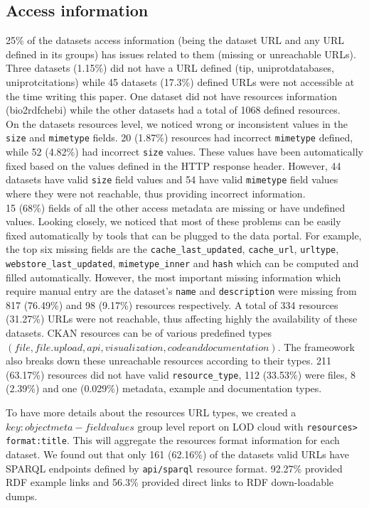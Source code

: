 \documentclass[runningheads,a4paper]{llncs}
\begin{document}
\subsection{Access information} 25\% of the datasets access information (being the dataset URL and any URL defined in its groups) has issues related to them (missing or unreachable URLs).
Three datasets (1.15\%) did not have a URL defined (tip, uniprot\-databases, uniprot\-citations) while 45 datasets (17.3\%) defined URLs were not accessible at the time writing this paper. One dataset did not have resources information (bio2rdf\-chebi) while the other datasets had a total of 1068 defined resources.\\
On the datasets resources level, we noticed wrong or inconsistent values in the \texttt{size} and \texttt{mimetype} fields. 20 (1.87\%) resources had incorrect \texttt{mimetype} defined, while 52 (4.82\%) had incorrect \texttt{size} values. These values have been automatically fixed based on the values defined in the HTTP response header. However, 44 datasets have valid \texttt{size} field values and 54 have valid \texttt{mimetype} field values where they were not reachable, thus providing incorrect information.\\
15 (68\%) fields of all the other access metadata are missing or have undefined values. Looking closely, we noticed that most of these problems can be easily fixed automatically by tools that can be plugged to the data portal. For example, the top six missing fields are the \texttt{cache\_last\_updated}, \texttt{cache\_url}, \texttt{url\-type}, \texttt{webstore\_last\_updated}, \texttt{mimetype\-\_inner} and \texttt{hash} which can be computed and filled automatically. However, the most important missing information which require manual entry are the dataset's \texttt{name} and \texttt{description} were missing from 817 (76.49\%) and 98 (9.17\%) resources respectively.
A total of 334 resources (31.27\%) URLs were not reachable, thus affecting highly the availability of these datasets. CKAN resources can be of various predefined types $(file, file.upload, api, visualization, code and documentation)$. The frameowork also breaks down these unreachable resources according to their types. 211 (63.17\%) resources did not have valid \texttt{resource\_type}, 112 (33.53\%) were files, 8 (2.39\%) and one (0.029\%) metadata, example and documentation types.

To have more details about the resources URL types, we created a $key:object meta-field values$ group level report on LOD cloud with \texttt{resources>\\format:title}. This will aggregate the resources format information for each dataset. We found out that only 161 (62.16\%) of the datasets valid URLs have SPARQL endpoints defined by \texttt{api/sparql} resource format. 92.27\% provided RDF example links and 56.3\% provided direct links to RDF down-loadable dumps.
\end{document}
